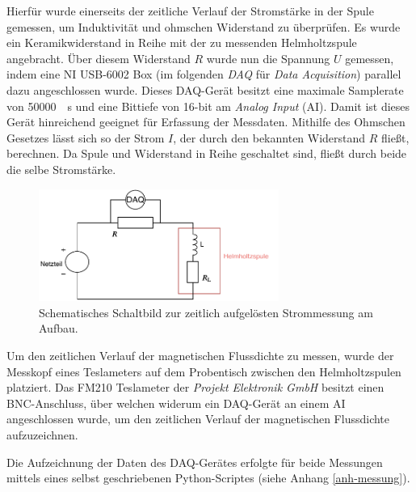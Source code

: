 \documentclass[page,pdftex,12pt,a4paper,twoside,openright]{scrbook}
\begin{document}
Hierfür wurde einerseits der zeitliche Verlauf der Stromstärke in der Spule gemessen, um Induktivität und ohmschen Widerstand zu überprüfen. Es wurde ein Keramikwiderstand in Reihe mit der zu messenden Helmholtzspule angebracht. Über diesem Widerstand \(R\) wurde nun die Spannung \(U\) gemessen, indem eine NI USB-6002 Box (im folgenden \emph{DAQ} für \emph{Data Acquisition}) parallel dazu angeschlossen wurde. Dieses DAQ-Gerät besitzt eine maximale Samplerate von \SI{50000}{\per\s} und eine Bittiefe von 16-bit am \emph{Analog Input} (AI). Damit ist dieses Gerät hinreichend geeignet für Erfassung der Messdaten. Mithilfe des Ohmschen Gesetzes lässt sich so der Strom \(I\), der durch den bekannten Widerstand \(R\) fließt, berechnen. Da Spule und Widerstand in Reihe geschaltet sind, fließt durch beide die selbe Stromstärke.

\begin{figure}[h]
\centering
\includegraphics[width=0.7\textwidth]{img/strommessung.pdf}
\caption{\label{fig-strommessung-aufbau}
Schematisches Schaltbild zur zeitlich aufgelösten Strommessung am Aufbau.}
\end{figure}

Um den zeitlichen Verlauf der magnetischen Flussdichte zu messen, wurde der Messkopf eines Teslameters auf dem Probentisch zwischen den Helmholtzspulen platziert. Das FM210 Teslameter der \emph{Projekt Elektronik GmbH} besitzt einen BNC-Anschluss, über welchen widerum ein DAQ-Gerät an einem AI angeschlossen wurde, um den zeitlichen Verlauf der magnetischen Flussdichte aufzuzeichnen.

Die Aufzeichnung der Daten des DAQ-Gerätes erfolgte für beide Messungen mittels eines selbst geschriebenen Python-Scriptes (siehe Anhang \ref{anh-messung}).
\end{document}
